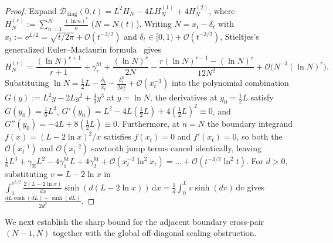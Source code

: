 \documentclass[11pt,reqno]{amsart}
\theoremstyle{definition}
\theoremstyle{remark}
\numberwithin{equation}{section}
\newcommand{\dd}{\mathrm{d}}
\newcommand{\ee}{\mathrm{e}}
\begin{document}
\begin{proof}
Expand $\mathcal{D}_{\mathrm{diag}}(0,t) = L^2 H_N - 4L H_N^{(1)} + 4H_N^{(2)}$, where $H_N^{(r)} := \sum_{n=1}^N \frac{(\ln n)^r}{n}$ ($N = N(t)$). Writing $N = x_t - \delta_t$ with $x_t := \ee^{L/2} = \sqrt{t/2\pi} + \mathcal{O}(t^{-3/2})$ and $\delta_t \in [0, 1) + \mathcal{O}(t^{-3/2})$, Stieltjes's generalized Euler--Maclaurin formula~\cite{stieltjes1885,olver1997} gives
\[
H_N^{(r)} = \frac{(\ln N)^{r+1}}{r+1} + \gamma_r^{\mathrm{St}} + \frac{(\ln N)^r}{2N} - \frac{r(\ln N)^{r-1} - (\ln N)^r}{12N^2} + \mathcal{O}\bigl(N^{-3}(\ln N)^r\bigr).
\]
Substituting $\ln N = \frac{1}{2}L - \frac{\delta_t}{x_t} - \frac{\delta_t^2}{2x_t^2} + \mathcal{O}(x_t^{-3})$ into the polynomial combination $G(y) := L^2 y - 2L y^2 + \frac{4}{3}y^3$ at $y = \ln N$, the derivatives at $y_0 = \frac{1}{2}L$ satisfy $G(y_0) = \frac{1}{6}L^3$, $G'(y_0) = L^2 - 4L(\frac{1}{2}L) + 4(\frac{1}{2}L)^2 \equiv 0$, and $G''(y_0) = -4L + 8(\frac{1}{2}L) \equiv 0$. Furthermore, at $n = N$ the boundary integrand $f(x) = (L - 2\ln x)^2/x$ satisfies $f(x_t) = 0$ and $f'(x_t) = 0$, so both the $\mathcal{O}(x_t^{-1})$ and $\mathcal{O}(x_t^{-2})$ sawtooth jump terms cancel identically, leaving $\frac{1}{6}L^3 + \gamma_{\mathrm{E}}L^2 - 4\gamma_1^{\mathrm{St}}L + 4\gamma_2^{\mathrm{St}} + \mathcal{O}(x_t^{-3}\ln^2 x_t) = \dots + \mathcal{O}(t^{-3/2}\ln^2 t)$. For $d > 0$, substituting $v = L - 2\ln x$ in $\int_1^{\ee^{L/2}} \frac{2(L-2\ln x)}{dx}\sinh(d(L-2\ln x))\,\dd x = \frac{1}{d}\int_0^L v\sinh(dv)\,\dd v$ gives $\frac{dL\cosh(dL)-\sinh(dL)}{2d^3}$.
\end{proof}

We next establish the sharp bound for the adjacent boundary cross-pair $(N-1,N)$ together with the global off-diagonal scaling obstruction.
\end{document}
